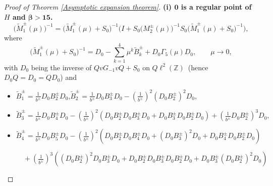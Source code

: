 \documentclass[reqno, 11pt]{amsart}
\newcommand\Z{\mathbb{Z}}
\numberwithin{equation}{section}
\begin{document}
\begin{proof}[Proof of Theorem {\rm\ref{Asymptotic expansion theorem}}]{\bf{(i) ${\bm{0}}$ is a regular point of $H$ and {$\bm{\beta>15}$}.}}
\begin{equation}\label{Relat of M1 tuta and M2}
\big(\widetilde{M}_{1}^{\pm}(\mu)\big)^{-1}=\big(\widetilde{M}_{1}^{\pm}(\mu)+S_0\big)^{-1}\Big(I+S_0\big(M^{\pm}_{2}(\mu)\big)^{-1}S_0\big(\widetilde{M}_{1}^{\pm}(\mu)+S_0\big)^{-1}\Big),
\end{equation}
where
\begin{equation}\label{expre of Bpm tuta}
\big(\widetilde{M}_{1}^{\pm}(\mu)+S_0\big)^{-1}=D_0-\sum\limits_{k=1}^{4}\mu^{k}\widetilde{B}_{k}^{\pm}+D_0\Gamma_5(\mu)D_0,\qquad\mu\rightarrow0,
\end{equation}
with $D_0$ being the inverse of $QvG_{-1}vQ+S_0$ on $Q\ell^2(\Z)$~(hence $D_0Q=D_0=QD_0$) and
\begin{itemize}
\item $\widetilde{B}_{1}^{\pm}=\frac{1}{b^{\pm}}D_0B^{\pm}_2D_0$,\quad$\widetilde{B}_{2}^{\pm}=\frac{1}{b^{\pm}}D_0B^{\pm}_3D_0-\left(\frac{1}{b^{\pm}}\right)^2\left(D_0B^{\pm}_2\right)^2D_0$,
\vskip0.2cm
\item
$\widetilde{B}_{3}^{\pm}=\frac{1}{b^{\pm}}D_0B^{\pm}_4D_0-\left(\frac{1}{b^{\pm}}\right)^2\left(D_0B^{\pm}_2D_0B^{\pm}_3D_0+D_0B^{\pm}_3D_0B^{\pm}_2D_0\right)+\left(\frac{1}{b^{\pm}}D_0B^{\pm}_2\right)^3D_0,$
\vskip0.2cm
\item $\widetilde{B}_{4}^{\pm}=\frac{1}{b^{\pm}}D_0B^{\pm}_5D_0-\left(\frac{1}{b^{\pm}}\right)^2\left(D_0B^{\pm}_2D_0B^{\pm}_4D_0+\left(D_0B^{\pm}_3\right)^2D_0+D_0B^{\pm}_4D_0B^{\pm}_2D_0\right)$

$\quad+\left(\frac{1}{b^{\pm}}\right)^3\left(\left(D_0B^{\pm}_2\right)^2D_0B^{\pm}_3D_0+D_0B^{\pm}_2D_0B^{\pm}_3D_0B^{\pm}_2D_0+D_0B^{\pm}_3\left(D_0B^{\pm}_2\right)^2D_0\right)$


\end{itemize}
\end{proof}
\end{document}
